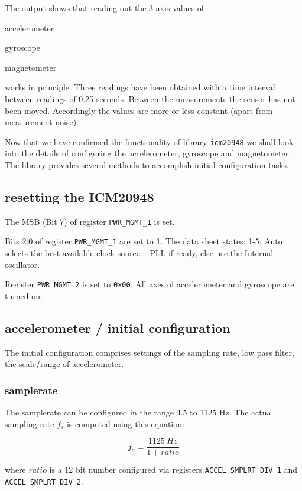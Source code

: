 \documentclass[paper=a4, oneside, fontsize=11pt,
parskip=full]{scrartcl}
\begin{document}
The output shows that reading out the 3-axis values of

\begin{compactitem}
	\item accelerometer
	\item gyroscope
	\item magnetometer
\end{compactitem}

works in principle. Three readings have been obtained with a time interval between readings of 0.25 seconds. Between the measurements the sensor has not been moved. Accordingly the values are more or less constant (apart from measurement noise).

Now that we have confirmed the functionality of library \verb|icm20948| we shall look into the details of configuring the accelerometer, gyroscope and magnetometer. The library provides several methods to accomplish initial configuration tasks.

\subsection{resetting the ICM20948}

The MSB (Bit 7) of register \verb|PWR_MGMT_1| is set.

Bits 2:0 of register \verb|PWR_MGMT_1| are set to 1. The data sheet states: 1-5: Auto selects the best available clock source – PLL if ready, else use the Internal oscillator.

Register \verb|PWR_MGMT_2| is set to \verb|0x00|. All axes of accelerometer and gyroscope are turned on.


\subsection{accelerometer / initial configuration}

The initial configuration comprises settings of the sampling rate, low pass filter, the scale/range of accelerometer.

\subsubsection{samplerate}

The samplerate can be configured in the range 4.5 to 1125 Hz. The actual sampling rate $f_s$ is computed using this equation:

\[
f_s = \frac{1125~Hz}{1 + ratio}
\]

where $ratio$ is a 12 bit number configured via registers \verb|ACCEL_SMPLRT_DIV_1| and \verb|ACCEL_SMPLRT_DIV_2|.
\end{document}
